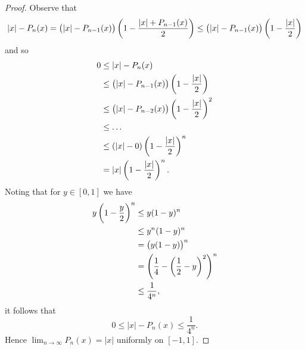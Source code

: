 \documentclass{article}
\begin{document}
\begin{proof}
Observe that
%
\begin{equation*}
    |x| - P_{n}(x)
        = \del{|x| - P_{n - 1}(x)} \del{1 - \frac{|x| + P_{n - 1}(x)}{2}}
        \leq \del{|x| - P_{n - 1}(x)} \del{1 - \frac{|x|}{2}}
\end{equation*}
%
and so
%
\begin{align*}
    0
        &\leq |x| - P_n(x) \\
        &\leq \del{|x| - P_{n - 1}(x)} \del{1 - \frac{|x|}{2}} \\
        &\leq \del{|x| - P_{n - 2}(x)} \del{1 - \frac{|x|}{2}}^2 \\
        &\leq \ldots \\
        &\leq (|x| - 0) \del{1 - \frac{|x|}{2}}^n \\
        &= |x| \del{1 - \frac{|x|}{2}}^n
        .
\end{align*}
%
Noting that for $y \in [0, 1]$ we have
%
\begin{align*}
    y \del{1 - \frac{y}{2}}^n
        &\leq y (1 - y)^n \\
        &\leq y^n (1 - y)^n \\
        &= \del{y (1 - y)}^n \\
        &= \del{\frac{1}{4} - \del{\frac{1}{2} - y}^2}^n \\
        &\leq \frac{1}{4^n}
        ,
\end{align*}
%
it follows that
%
\begin{equation*}
    0 \leq |x| - P_n(x) \leq \frac{1}{4^n}
    .
\end{equation*}
%
Hence $\lim_{n \to \infty} P_n(x) = |x|$ uniformly on $[-1, 1]$.

\end{proof}
\end{document}
